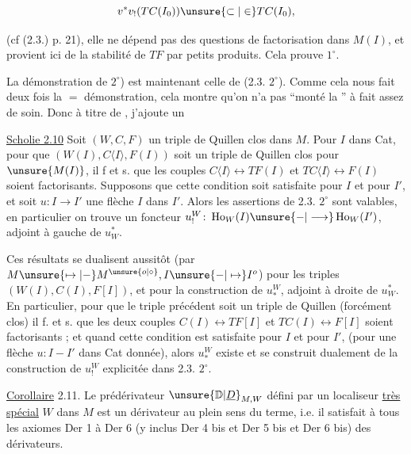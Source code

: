 \[
 v^*v_!(TC(I_0))\unsure{\subset|\in} TC(I_0),
\]

(cf (2.3.) p. 21), elle ne dépend pas des
questions de factorisation dans $M(I)$, et provient
ici de la stabilité de $TF$ par petits
produits. Cela prouve $1^\circ$.

La démonstration de $2^\circ$) est maintenant
 celle de (2.3. $2^\circ$). Comme cela nous fait
 deux fois la $=$ démonstration, cela
montre qu'on n'a pas ``monté la '' 
à fait  assez de soin. Donc à titre
de , j'ajoute un

\uline{Scholie 2.10} Soit $(W,C,F)$ un triple de Quillen
clos dans $M$. Pour  $I$ dans Cat, pour que
$(W(I),C\langle I\rangle,F(I))$ soit un triple de Quillen
clos pour $\unsure{M(I)}$, il f et s. que les
couples $C\langle I\rangle\longleftrightarrow TF(I)$ et $TC\langle I\rangle\longleftrightarrow F(I)$
soient factorisants. Supposons que cette
condition soit satisfaite pour $I$ et pour $I'$,
et soit $u\colon I\longrightarrow I'$ une flèche 
$I$ dans $I'$. Alors les assertions de 2.3. $2^\circ$
sont valables, en particulier on trouve un
foncteur $u_!^W\colon\operatorname{Ho}_W(I)\unsure{-|\longrightarrow}\operatorname{Ho}_W(I')$, adjoint
à gauche de $u^*_W$.


Ces résultats se
dualisent aussitôt (par $M\unsure{\mapsto|-} M^{\unsure{o|\circ}}, I\unsure{-|\mapsto}I^{o}$)
pour les triples $(W(I),C(I),F[I])$,
et pour la construction de $u_*^W$, adjoint
à droite de $u^*_W$. En particulier, pour que
le triple précédent soit un triple de Quillen
(forcément clos) il f. et s. que les deux
couples $C(I)\longleftrightarrow TF[I]$ et $TC(I)\longleftrightarrow F[I]$
soient factorisants ; et quand cette condition
est satisfaite pour $I$ et pour $I'$, (pour une
flèche $u\colon I\mathrel{-} I'$ dans Cat donnée), alors
$u_*^W$ existe et se construit dualement de
la construction de $u_!^W$ explicitée dans
2.3. $2^\circ$.

\uline{Corollaire} 2.11. Le prédérivateur $\unsure{\mathbb{D}|\underline{D}}_{M,W}$ défini
par un localiseur \uline{très spécial} $W$ dans $M$
est un dérivateur au plein sens du terme,
i.e. il satisfait à tous les axiomes
Der 1 à Der 6 (y inclus Der 4 bis et
Der 5 bis et Der 6 bis) des dérivateurs.


